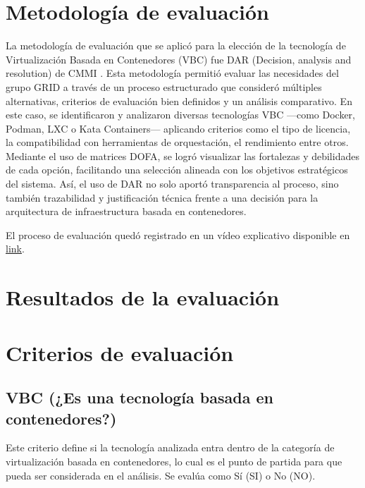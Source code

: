 \label{cap:dar}

\section{Metodología de evaluación}

La metodología de evaluación que se aplicó para la elección de la tecnología de Virtualización Basada en Contenedores (VBC) fue DAR (Decision, analysis and resolution) de CMMI \citep{CMMIInstitute2010}. Esta metodología permitió evaluar las necesidades del grupo GRID a través de un proceso estructurado que consideró múltiples alternativas, criterios de evaluación bien definidos y un análisis comparativo. En este caso, se identificaron y analizaron diversas tecnologías VBC —como Docker, Podman, LXC o Kata Containers— aplicando criterios como el tipo de licencia, la compatibilidad con herramientas de orquestación, el rendimiento entre otros. Mediante el uso de matrices DOFA, se logró visualizar las fortalezas y debilidades de cada opción, facilitando una selección alineada con los objetivos estratégicos del sistema. Así, el uso de DAR no solo aportó transparencia al proceso, sino también trazabilidad y justificación técnica frente a una decisión para la arquitectura de infraestructura basada en contenedores.

El proceso de evaluación quedó registrado en un vídeo explicativo disponible en \href{https://youtu.be/xOmuQs2RX2c}{link}.

\section{Resultados de la evaluación}



\section{Criterios de evaluación}

\subsection{VBC (¿Es una tecnología basada en contenedores?)}
Este criterio define si la tecnología analizada entra dentro de la categoría de virtualización basada en contenedores, lo cual es el punto de partida para que pueda ser considerada en el análisis. Se evalúa como Sí (SI) o No (NO).

